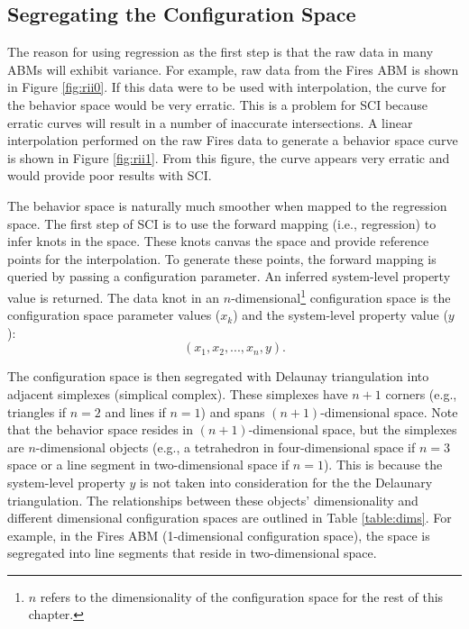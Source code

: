 \subsection{Segregating the Configuration Space}
The reason for using regression as the first step is that the raw data in many ABMs will exhibit variance.
For example, raw data from the Fires ABM is shown in Figure \ref{fig:rii0}.
If this data were to be used with interpolation, the curve for the behavior space would be very erratic.
This is a problem for SCI because erratic curves will result in a number of inaccurate intersections.
A linear interpolation performed on the raw Fires data to generate a behavior space curve is shown in Figure \ref{fig:rii1}.
From this figure, the curve appears very erratic and would provide poor results with SCI.


The behavior space is naturally much smoother when mapped to the regression space.
The first step of SCI is to use the forward mapping (i.e., regression) to infer knots in the space.
These knots canvas the space and provide reference points for the interpolation.
To generate these points, the forward mapping is queried by passing a configuration parameter.
An inferred system-level property value is returned.
The data knot in an $n$-dimensional\footnote{$n$ refers to the dimensionality of the configuration space for the rest of this chapter.}  configuration space is the configuration space parameter values ($x_k$) and the system-level property value ($y$):
\[(x_1, x_2, ..., x_n, y).\]

The configuration space is then segregated with Delaunay triangulation  into adjacent simplexes (simplical complex).
These simplexes have $n + 1$ corners (e.g., triangles if $n=2$ and lines if $n=1$) and spans $(n+1)$-dimensional space.
Note that the behavior space resides in $(n+1)$-dimensional space, but the simplexes are $n$-dimensional objects (e.g., a tetrahedron in four-dimensional space if $n=3$ space or a line segment in two-dimensional space if $n=1$).
This is because the system-level property $y$ is not taken into consideration for the the Delaunary triangulation.
The relationships between these objects' dimensionality and different dimensional configuration spaces are outlined in Table \ref{table:dims}.
For example, in the Fires ABM (1-dimensional configuration space), the space is segregated into line segments that reside in two-dimensional space.

